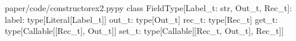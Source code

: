 \begin{fileminted}{paper/code/constructorex2.py}{py}
class FieldType[Label_t: str, Out_t, Rec_t]:
    label: type[Literal[Label_t]]
    out_t: type[Out_t]
    rec_t: type[Rec_t]
    get_t: type[Callable[[Rec_t], Out_t]]
    set_t: type[Callable[[Rec_t, Out_t], Rec_t]]
\end{fileminted}
        